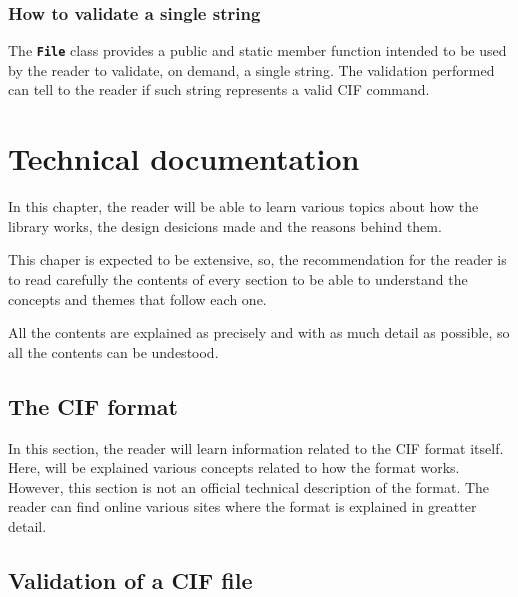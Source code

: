 \documentclass[11pt,twoside,openany,x11names,svgnames]{memoir}
\newcommand\chapterillustration{}
\begin{document}
\subsection{How to validate a single string}

The \textbf{\texttt{File}} class provides a public and static member function intended to be used by the reader to validate, on demand, a single string. The validation performed can tell to the reader if such string represents a valid CIF command.

\renewcommand\chapterillustration{images/chapter03-cover}
\chapter{Technical documentation}\label{Technical-documentation}

In this chapter, the reader will be able to learn various topics about how the library works, the design desicions made and the reasons behind them.

This chaper is expected to be extensive, so, the recommendation for the reader is to read carefully the contents of every section to be able to understand the concepts and themes that follow each one.

All the contents are explained as precisely and with as much detail as possible, so all the contents can be undestood.
\newpage 

\section{The CIF format}\label{The-CIF-format}

In this section, the reader will learn information related to the CIF format itself. Here, will be explained various concepts related to how the format works. However, this section is not an official technical description of the format. The reader can find online various sites where the format is explained in greatter detail.

\section{Validation of a CIF file}\label{Validation-of-a-cif-file}
\end{document}
